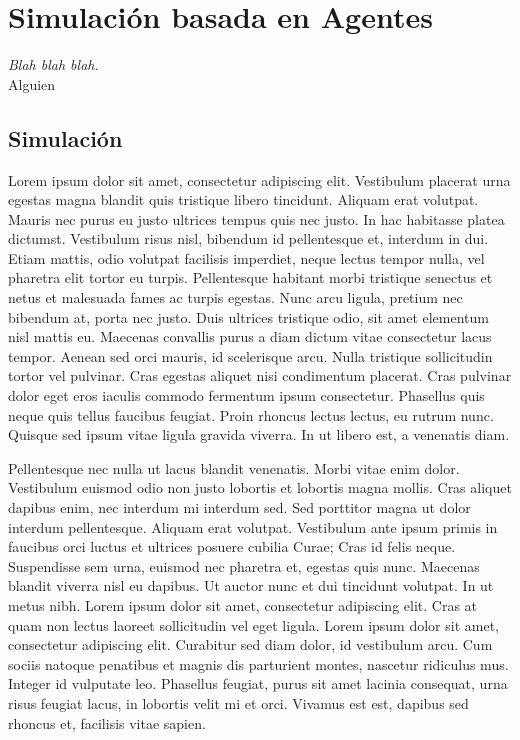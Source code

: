 
\chapter*{Simulación basada en Agentes} \label{cap1}


\begin{flushright}
\begin{minipage}{7.85cm}
    {\em Blah blah blah.} \\  Alguien
\end{minipage}
\end{flushright}

\vspace*{5mm}

\section*{Simulación}

Lorem ipsum dolor sit amet, consectetur adipiscing elit. Vestibulum placerat
urna egestas magna blandit quis tristique libero tincidunt. Aliquam erat
volutpat. Mauris nec purus eu justo ultrices tempus quis nec justo. In hac
habitasse platea dictumst. Vestibulum risus nisl, bibendum id pellentesque et,
interdum in dui. Etiam mattis, odio volutpat facilisis imperdiet, neque lectus
tempor nulla, vel pharetra elit tortor eu turpis. Pellentesque habitant morbi
tristique senectus et netus et malesuada fames ac turpis egestas. Nunc arcu
ligula, pretium nec bibendum at, porta nec justo. Duis ultrices tristique odio,
sit amet elementum nisl mattis eu. Maecenas convallis purus a diam dictum vitae
consectetur lacus tempor. Aenean sed orci mauris, id scelerisque arcu. Nulla
tristique sollicitudin tortor vel pulvinar. Cras egestas aliquet nisi
condimentum placerat. Cras pulvinar dolor eget eros iaculis commodo fermentum
ipsum consectetur. Phasellus quis neque quis tellus faucibus feugiat. Proin
rhoncus lectus lectus, eu rutrum nunc. Quisque sed ipsum vitae ligula gravida
viverra. In ut libero est, a venenatis diam.

Pellentesque nec nulla ut lacus blandit venenatis. Morbi vitae enim dolor.
Vestibulum euismod odio non justo lobortis et lobortis magna mollis. Cras
aliquet dapibus enim, nec interdum mi interdum sed. Sed porttitor magna ut dolor
interdum pellentesque. Aliquam erat volutpat. Vestibulum ante ipsum primis in
faucibus orci luctus et ultrices posuere cubilia Curae; Cras id felis neque.
Suspendisse sem urna, euismod nec pharetra et, egestas quis nunc. Maecenas
blandit viverra nisl eu dapibus. Ut auctor nunc et dui tincidunt volutpat. In ut
metus nibh. Lorem ipsum dolor sit amet, consectetur adipiscing elit. Cras at
quam non lectus laoreet sollicitudin vel eget ligula. Lorem ipsum dolor sit
amet, consectetur adipiscing elit. Curabitur sed diam dolor, id vestibulum arcu.
Cum sociis natoque penatibus et magnis dis parturient montes, nascetur ridiculus
mus. Integer id vulputate leo. Phasellus feugiat, purus sit amet lacinia
consequat, urna risus feugiat lacus, in lobortis velit mi et orci. Vivamus est
est, dapibus sed rhoncus et, facilisis vitae sapien.


